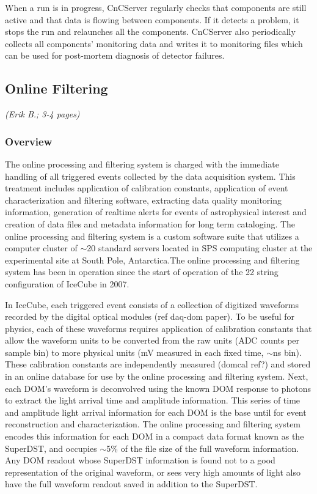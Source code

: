 When a run is in progress, CnCServer regularly checks that components are still
active and that data is flowing between components.  If it detects a problem,
it stops the run and relaunches all the components.  CnCServer also
periodically collects all components' monitoring data and writes it to
monitoring files which can be used for post-mortem diagnosis of detector
failures.

\subsection{Online Filtering}
\textsl{(Erik B.; 3-4 pages)}
\subsubsection{Overview}

The online processing and filtering system is charged with the immediate handling of all triggered events collected by the data
acquisition system.  This treatment includes application of calibration constants, application of event characterization and filtering software,  
extracting data quality monitoring information, generation of realtime alerts for events of astrophysical interest
and creation of data files and metadata information for long term cataloging.  The online processing and filtering system
is a custom software suite that utilizes a computer cluster of $\sim$20 standard servers located in SPS computing cluster
at the experimental site at South Pole, Antarctica.The online processing and filtering system has been in operation since the
start of operation of the 22 string configuration of IceCube in 2007.

In IceCube, each triggered event consists of a collection of digitized waveforms recorded by the digital optical modules (ref daq-dom paper).
To be useful for physics, each of these waveforms requires application of calibration constants that allow the waveform units
to be converted from the raw units (ADC counts per sample bin) to more physical units (mV measured in each fixed time, $\sim$ns bin).  These
calibration constants are independently measured (domcal ref?) and stored in an online database for use by
the online processing and filtering system.  Next, each DOM's waveform is deconvolved using the known DOM response
to photons to extract the light arrival time and amplitude information.  This series of time and amplitude light arrival information
for each DOM is the base until for event reconstruction and characterization.  The online processing and filtering system encodes
this information for each DOM in a compact data format known as the SuperDST, and occupies $\sim$5\%  of the file size
of the full waveform information.  Any DOM readout whose SuperDST information is found not to a good representation of the
original waveform, or sees very high amounts of light also have the full waveform readout saved in addition to the SuperDST.

